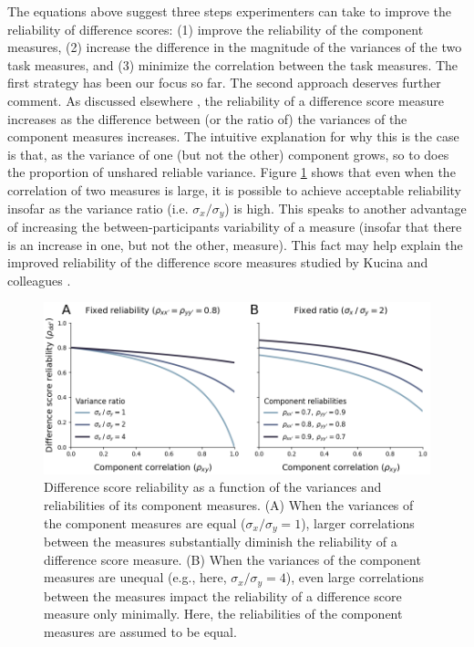 \documentclass[a4paper,notitlepage,12pt]{article}
\begin{document}
The equations above suggest three steps experimenters can take to improve the reliability of difference scores: (1) improve the reliability of the component measures, (2) increase the difference in the magnitude of the variances of the two task measures, and (3) minimize the correlation between the task measures. The first strategy has been our focus so far. The second approach deserves further comment. As discussed elsewhere \cite{chiou1996reliability}, the reliability of a difference score measure increases as the difference between (or the ratio of) the variances of the component measures increases. The intuitive explanation for why this is the case is that, as the variance of one (but not the other) component grows, so to does the proportion of unshared reliable variance. Figure \ref{fig:fig03} shows that even when the correlation of two measures is large, it is possible to achieve acceptable reliability insofar as the variance ratio (i.e. $\sigma_x / \sigma_y$) is high. This speaks to another advantage of increasing the between-participants variability of a measure (insofar that there is an increase in one, but not the other, measure). This fact may help explain the improved reliability of the difference score measures studied by Kucina and colleagues \cite{kucina2022solution}.

\begin{figure}[tp]
    \centering
    \includegraphics[width=1\textwidth]{figures/fig02.png}
    \caption{Difference score reliability as a function of the variances and reliabilities of its component measures. (A) When the variances of the component measures are equal ($\sigma_x / \sigma_y = 1$), larger correlations between the measures substantially diminish the reliability of a difference score measure. (B) When the variances of the component measures are unequal (e.g., here, $\sigma_x / \sigma_y = 4$), even large correlations between the measures impact the reliability of a difference score measure only minimally. Here, the reliabilities of the component measures are assumed to be equal.}
    \label{fig:fig03}
\end{figure}
\end{document}
